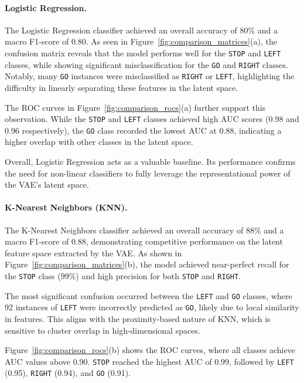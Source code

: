 \paragraph{Logistic Regression.}

The Logistic Regression classifier achieved an overall accuracy of 80\% and a macro F1-score of 0.80. As seen in Figure~\ref{fig:comparison_matrices}(a), the confusion matrix reveals that the model performs well for the \texttt{STOP} and \texttt{LEFT} classes, while showing significant misclassification for the \texttt{GO} and \texttt{RIGHT} classes. Notably, many \texttt{GO} instances were misclassified as \texttt{RIGHT} or \texttt{LEFT}, highlighting the difficulty in linearly separating these features in the latent space.

The ROC curves in Figure~\ref{fig:comparison_rocs}(a) further support this observation. While the \texttt{STOP} and \texttt{LEFT} classes achieved high AUC scores (0.98 and 0.96 respectively), the \texttt{GO} class recorded the lowest AUC at 0.88, indicating a higher overlap with other classes in the latent space.

Overall, Logistic Regression acts as a valuable baseline. Its performance confirms the need for non-linear classifiers to fully leverage the representational power of the VAE's latent space.

\paragraph{K-Nearest Neighbors (KNN).}

The K-Nearest Neighbors classifier achieved an overall accuracy of 88\% and a macro F1-score of 0.88, demonstrating competitive performance on the latent feature space extracted by the VAE. As shown in Figure~\ref{fig:comparison_matrices}(b), the model achieved near-perfect recall for the \texttt{STOP} class (99\%) and high precision for both \texttt{STOP} and \texttt{RIGHT}.

The most significant confusion occurred between the \texttt{LEFT} and \texttt{GO} classes, where 92 instances of \texttt{LEFT} were incorrectly predicted as \texttt{GO}, likely due to local similarity in features. This aligns with the proximity-based nature of KNN, which is sensitive to cluster overlap in high-dimensional spaces.

Figure~\ref{fig:comparison_rocs}(b) shows the ROC curves, where all classes achieve AUC values above 0.90. \texttt{STOP} reached the highest AUC of 0.99, followed by \texttt{LEFT} (0.95), \texttt{RIGHT} (0.94), and \texttt{GO} (0.91).


